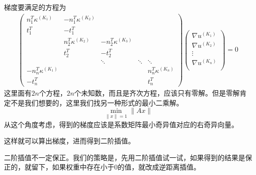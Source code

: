 \documentclass[12pt,a4paper]{article}
\begin{document}
梯度要满足的方程为
\begin{align*}
\left(
\begin{matrix}
n_1^T \kappa^{(K_1)} & -n_1^T \kappa^{(K_2)} &  &  &  \\
t_1^T & -t_1^T &  &  &  \\
 & n_2^T \kappa^{(K_2)} & -n_2^T \kappa^{(K_3)} &  &  \\
 & t_2^T & -t_2^T &  &  \\
 &  & \ddots & \ddots & \ddots \\
-n_n^T \kappa^{(K_1)} &  &  &  & n_n^T \kappa^{(K_n)} \\
-t_n^T &  &  &  & t_n^T
\end{matrix}
\right)
\left(
\begin{matrix}
\nabla u^{(K_1)} \\
\nabla u^{(K_2)} \\
\vdots \\
\nabla u^{(K_n)} \\
\end{matrix}
\right)
= 0
\end{align*}
这里面有$2n$个方程，$2n$个未知数，而且是齐次方程，应该只有零解。但是零解肯定不是我们想要的，这里我们找另一种形式的最小二乘解。
$$ \min_{\|x\| = 1} \|A x\| $$
从这个角度考虑，得到的梯度应该是系数矩阵最小奇异值对应的右奇异向量。

这样就可以算出梯度，进而得到二阶插值。

二阶插值不一定保正。我们的策略是，先用二阶插值试一试，如果得到的结果是保正的，就留下，如果权重中存在小于0的值，就改成逆距离插值。
\end{document}
